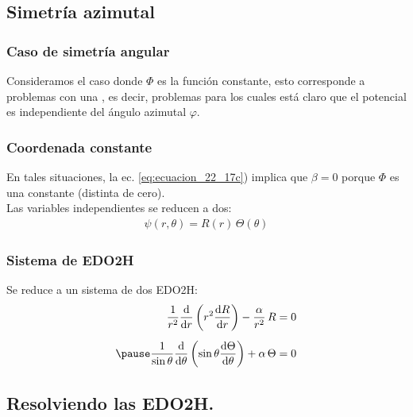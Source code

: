 \documentclass[12pt]{beamer}
\begin{document}
\subsection{Simetría azimutal}

\begin{frame}
\frametitle{Caso de simetría angular}
Consideramos el caso donde $\Phi$ es la función constante, \pause esto corresponde a problemas con una , \pause es decir, problemas para los cuales está claro  que el potencial es independiente del ángulo azimutal $\varphi$.
\end{frame}
\begin{frame}
\frametitle{Coordenada constante}
En tales situaciones, la ec. \ref{eq:ecuacion_22_17c}) implica que $\beta = 0$ porque $\Phi$ es una constante (distinta de cero).
\\
\bigskip
\pause
Las variables independientes se reducen a dos: 
\begin{align*}
\psi (r, \theta) = R (r) \, \Theta (\theta)    
\end{align*}
\end{frame}
\begin{frame}
\frametitle{Sistema de EDO2H}
Se reduce a un sistema de dos EDO2H:
\pause
\begin{eqnarray}
\begin{aligned}
\dfrac{1}{r^{2}} \dv{r} \left( r^{2} \dv{R}{r} \right) - \dfrac{\alpha}{r^{2}} \, R &= 0 \\[0.5em]  \pause
\dfrac{1}{\sin \theta} \dv{\theta} \left( \sin \theta \dv{\Theta}{\theta} \right) + \alpha \, \Theta &= 0
\end{aligned}
\label{eq:ecuacion_26_02}
\end{eqnarray}
\end{frame}

\subsection{Resolviendo las EDO2H.}
\end{document}
